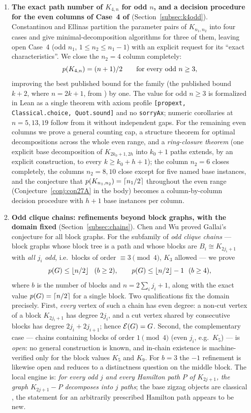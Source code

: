 \begin{enumerate}[label=(\roman*),leftmargin=2em]
\item \textbf{The exact path number of $K_{4,n}$ for odd $n$, and a decision procedure for
the even columns of Case~4 of \cite{CE18}} (Section~\ref{subsec:k4odd}). Constantinou and
Ellinas \cite{CE18} partition the parameter pairs of $K_{n_1,n_2}$ into four cases and give
minimal-decomposition algorithms for three of them, leaving open Case~4 (odd $n_1$,
$1\le n_2\le n_1-1$) with an explicit request for its ``exact characteristics''. We close the
$n_2=4$ column completely:
\[
p(K_{4,n})=(n+1)/2 \qquad\text{for every odd } n\ge3,
\]
improving the best published bound for the family (the published bound $k+2$, where
$n=2k+1$, from \cite{Pyb96,Fan05,LY24}) by one. The value for odd $n\ge3$ is formalized in Lean as a
single theorem with axiom profile \texttt{[propext, Classical.choice, Quot.sound]} and no
\texttt{sorryAx}; numeric corollaries at $n=5,13,19$ follow from it without independent
gaps. For the remaining even columns we prove a general counting cap, a structure theorem
for optimal decompositions across the whole even range, and a \emph{ring-closure theorem}
(one explicit base decomposition of $K_{2k_0+1,2h}$ into $k_0+1$ paths extends, by an
explicit construction, to every $k\ge k_0+h+1$); the column $n_2=6$ closes completely, the
columns $n_2=8,10$ close except for five named base instances, and the conjecture that
$p(K_{n_1,n_2})=\left\lceil n_1/2 \right\rceil$ throughout the even range (Conjecture~\ref{conj:con27A} in the
body) becomes a column-by-column decision procedure with $h+1$ base instances per column.

\item \textbf{Odd clique chains: refinements beyond block graphs, with the domain fixed}
(Section~\ref{subsec:chains}). Chen and Wu \cite{CW25} proved Gallai's conjecture for all block
graphs. For the subfamily of \emph{odd clique chains} --- block graphs whose block tree is a
path and whose blocks are $B_i\cong K_{2j_i+1}$ with \emph{all $j_i$ odd}, i.e.\ blocks of
order $\equiv 3 \pmod 4$, $K_3$ allowed --- we prove
\[
\pn(G)\le \floor{n/2}\ \ (b\ge2), \qquad \pn(G)\le \floor{n/2}-1\ \ (b\ge4),
\]
where $b$ is the number of blocks and $n=2\sum_i j_i+1$, along with the exact value
$p(G)=\left\lceil n/2 \right\rceil$ for a single block. Two qualifications fix the domain precisely. First,
\emph{every} vertex of such a chain has even degree: a non-cut vertex of a block
$K_{2j_i+1}$ has degree $2j_i$, and a cut vertex shared by consecutive blocks has degree
$2j_i+2j_{i+1}$; hence $\mathcal{E}(G)=G$. Second, the complementary case --- chains containing
blocks of order $1 \pmod 4$ (even $j_i$, e.g.\ $K_5$) --- is \emph{open}: no general
construction is known, and in-chain existence is machine-verified only for the block values
$K_5$ and $K_9$. For $b=3$ the $-1$ refinement is likewise open and reduces to a
distinctness question on the middle block. The local engine is: \emph{for every odd $j$ and
every Hamilton path $P$ of $K_{2j+1}$, the graph $K_{2j+1}-P$ decomposes into $j$ paths};
the base zigzag objects are classical \cite{LP92,Alspach08}, the statement for an
arbitrarily prescribed Hamilton path appears to be new.


\end{enumerate}
